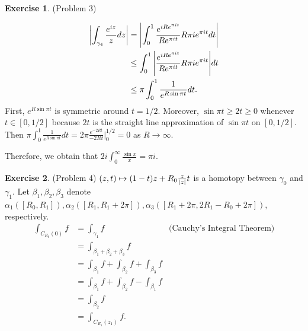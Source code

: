 \documentclass[12pt, psamsfonts]{amsart}
\theoremstyle{definition}
\newtheorem*{exer}{Exercise}
\theoremstyle{remark}
\numberwithin{equation}{section}
\begin{document}
\begin{exer}{(Problem 3)}
\begin{itemize}
      \begin{align*}
        \abs{\int_{\gamma_4} \frac{e^{iz}}{z} dz}
          &= \abs{\int_{0}^{1} \frac{e^{iRe^{\pi i t}}}{Re^{\pi i t}}R\pi i e^{\pi i t} dt } \\
          &\leq \int_{0}^{1} \abs{\frac{e^{iRe^{\pi i t}}}{Re^{\pi i t}}R\pi i e^{\pi i t}} dt \\
          &\leq \pi \int_{0}^{1} \frac{1}{e^{R\sin \pi t}} dt.
      \end{align*}
      First, $e^{R\sin \pi t}$ is symmetric around $t = 1/2$.
      Moreover, $\sin \pi t \geq 2t \geq 0$ whenever $t \in [0, 1/2]$ because $2t$ is the straight line approximation of $\sin \pi t$ on $[0, 1 / 2]$.
      Then $\pi \int_{0}^{1} \frac{1}{e^{R\sin \pi t}} dt = 2\pi \frac{e^{-2Rt}}{-2Rt}\big\vert^{1/2}_{0} = 0$ as $R \rightarrow \infty$.
  \end{itemize}
  Therefore, we obtain that $2i\int_{0}^{\infty} \frac{\sin x}{x} = \pi i$.
\end{exer}

\begin{exer}{(Problem 4)}
  $(z, t) \mapsto (1 - t)z + R_0\frac{z}{\abs{z}}t$ is a homotopy between $\gamma_0$ and $\gamma_1$.
  Let $\beta_1, \beta_2, \beta_3$ denote $\alpha_1([R_0, R_1]), \alpha_2([R_1, R_1 + 2\pi]), \alpha_3([R_1 + 2\pi, 2R_1 - R_0 + 2\pi])$, respectively.
  \begin{align*}
    \int_{C_{R_0}(0)} f
      &= \int_{\gamma_1} f & \text{(Cauchy's Integral Theorem)} \\
      &= \int_{\beta_1 + \beta_2 + \beta_3} f \\
      &= \int_{\beta_1} f + \int_{\beta_2} f + \int_{\beta_3} f \\
      &= \int_{\beta_1} f + \int_{\beta_2} f - \int_{\beta_1} f \\
      &= \int_{\beta_2} f \\
      &= \int_{C_{R_1}(z_1)} f.
  \end{align*}
\end{exer}
\end{document}
